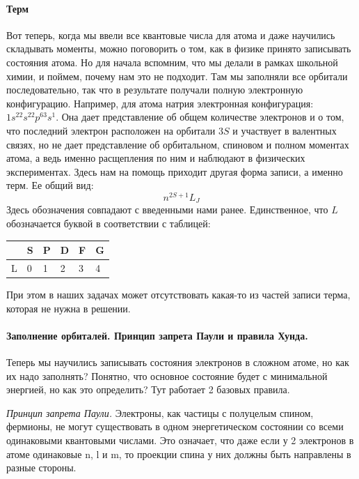 \documentclass[12pt]{article}
\begin{document}
\paragraph{Терм}
Вот теперь, когда мы ввели все квантовые числа для атома и даже научились складывать моменты, можно поговорить о том, как в физике принято записывать состояния атома. Но для начала вспомним, что мы делали в рамках школьной химии, и поймем, почему нам это не подходит. Там мы заполняли все орбитали последовательно, так что в результате получали полную электронную конфигурацию. Например, для атома натрия электронная конфигурация: $1s^22s^22p^63s^1$. Она дает представление об общем количестве электронов и о том, что последний электрон расположен на орбитали $3S$ и участвует в валентных связях, но не дает представление об орбитальном, спиновом и полном моментах атома, а ведь именно расщепления по ним и наблюдают в физических экспериментах. Здесь нам на помощь приходит другая форма записи, а именно терм. Ее общий вид:
\begin{equation*}
    n^{2S+1}L_J
\end{equation*}
Здесь обозначения совпадают с введенными нами ранее. Единственное, что $L$ обозначается буквой в соответствии с таблицей:
\begin{table}[H]
\centering
\begin{tabular}{|l|l|l|l|l|l|}
\hline
\multicolumn{1}{|c|}{} & \multicolumn{1}{c|}{S} & \multicolumn{1}{c|}{P} & \multicolumn{1}{c|}{D} & \multicolumn{1}{c|}{F} & \multicolumn{1}{c|}{G} \\ \hline
L                      & 0                      & 1                      & 2                      & 3                      & 4                      \\ \hline
\end{tabular}
\end{table}
\noindent
При этом в наших задачах может отсутствовать какая-то из частей записи терма, которая не нужна в решении.
\paragraph{Заполнение орбиталей. Принцип запрета Паули и правила Хунда.}
Теперь мы научились записывать состояния электронов в сложном атоме, но как их надо заполнять? Понятно, что основное состояние будет с минимальной энергией, но как это определить? Тут работает 2 базовых правила.

\vspace{3mm} \noindent
\textit{Принцип запрета Паули.} Электроны, как частицы с полуцелым спином, фермионы, не могут существовать в одном энергетическом состоянии со всеми одинаковыми квантовыми числами. Это означает, что даже если у 2 электронов в атоме одинаковые n, l и m, то проекции спина у них должны быть направлены в разные стороны.
\end{document}
